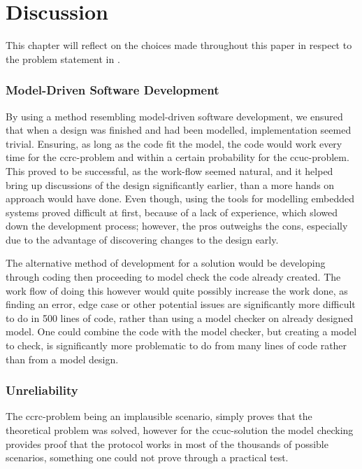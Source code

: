 \section{Discussion}\label{sec:discussion}
This chapter will reflect on the choices made throughout this paper in respect to the problem statement in .

\subsubsection{Model-Driven Software Development}
By using a method resembling model-driven software development, we ensured that when a design was finished and had been modelled, implementation seemed trivial.
Ensuring, as long as the code fit the model, the code would work every time for the \gls{ccrc}-problem and within a certain probability for the \gls{ccuc}-problem.
This proved to be successful, as the work-flow seemed natural, and it helped bring up discussions of the design significantly earlier, than a more hands on approach would have done.
Even though, using the tools for modelling embedded systems proved difficult at first, because of a lack of experience, which slowed down the development process; however, the pros outweighs the cons, especially due to the advantage of discovering changes to the design early.

The alternative method of development for a solution would be developing through coding then proceeding to model check the code already created.
The work flow of doing this however would quite possibly increase the work done, as finding an error, edge case or other potential issues are significantly more difficult to do in 500 lines of code, rather than using a model checker on already designed model.
One could combine the code with the model checker, but creating a model to check, is significantly more problematic to do from many lines of code rather than from a model design.

\subsubsection{Unreliability}
The \gls{ccrc}-problem being an implausible scenario, simply proves that the theoretical problem was solved, however for the \gls{ccuc}-solution the model checking provides proof that the protocol works in most of the thousands of possible scenarios, something one could not prove through a practical test.

